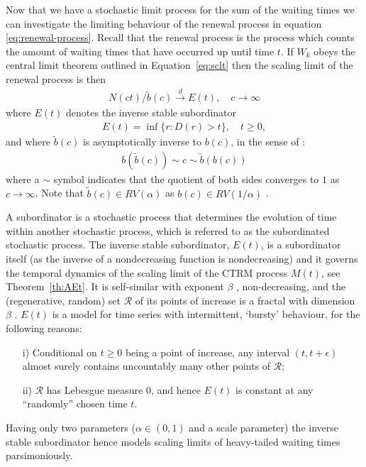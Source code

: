 \documentclass[honours,12pt]{UNSWthesis}
\newcommand{\1}{\mathbf 1}
\newcommand{\cd}{\overset{d}{\longrightarrow}}
\numberwithin{equation}{section}
\theoremstyle{definition}
\theoremstyle{remark}
\begin{document}
Now that we have a stochastic limit process for the sum of the waiting times we can investigate the limiting behaviour of the renewal process in equation \ref{eq:renewal-process}. Recall that the renewal process is the process which counts the amount of waiting times that have occurred up until time $t$. If $W_k$ obeys the central limit theorem outlined in Equation~\ref{eq:sclt} then the scaling limit of the renewal process is then \cite{limitCTRW}
\begin{align}
N(ct) / \tilde b(c) \cd E(t), \quad c \to \infty
\end{align}
where $E(t)$ denotes the inverse stable subordinator \cite{invSubord}
\begin{align}
E(t) = \inf\{r: D(r) > t\}, \quad t \ge 0,
\end{align}
and where $\tilde b(c)$ is asymptotically inverse to $b(c)$, in the sense
of \cite[p.20]{seneta}: 
\begin{align}
b(\tilde b(c)) \sim c \sim \tilde b(b(c))
\end{align}
where a $\sim$ symbol indicates that the quotient of both sides converges to
$1$ as $c \to \infty$. 
Note that $\tilde b(c) \in RV(\alpha)$ as $b(c) \in RV(1/\alpha)$ \cite[Prop~4.15]{MeerschaertSikorskii2012}. 

A subordinator is a stochastic process that determines the evolution of time within another stochastic process, which is referred to as the subordinated stochastic process. The inverse stable subordinator, $E(t)$, is a subordinator itself (as the inverse of a nondecreasing function is nondecreasing) and it governs the temporal dynamics of
the scaling limit of the CTRM process $M(t)$, see Theorem~\ref{th:AEt}. 
It is self-similar with exponent $\beta$
\cite{limitCTRW}, non-decreasing, and the (regenerative, random) set 
$\mathcal R$ of its points of increase is a fractal with dimension $\beta$ 
\cite{Bertoin04}.
$E(t)$ is a model for time series with intermittent, `bursty'
behaviour, for the following reasons:
\begin{itemize}
\item [i)]
Conditional on $t \ge 0$ being a point of increase, any interval 
$(t, t+ \epsilon)$ almost surely contains uncountably many other points of 
$\mathcal R$; 
\item [ii)]
$\mathcal R$ has Lebesgue measure $0$, and hence $E(t)$ is
constant at any ``randomly'' chosen time $t$. 
\end{itemize}
Having only two parameters ($\alpha \in (0,1)$ and a scale parameter)
the inverse stable subordinator hence models scaling limits of heavy-tailed 
waiting times parsimoniously.
\end{document}
